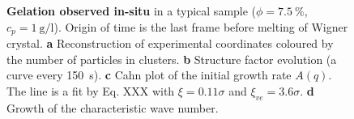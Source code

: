\begin{figure}
\caption{\textbf{Gelation observed in-situ} in a typical sample ($\phi=7.5~\%$, $c_p=\SI{1}{\gram\per\litre}$). Origin of time is the last frame before melting of Wigner crystal. \textbf{a} Reconstruction of experimental coordinates coloured by the number of particles in clusters. \textbf{b} Structure factor evolution (a curve every \SI{150}{\second}). \textbf{c} Cahn plot of the initial growth rate $A(q)$. The line is a fit by Eq. XXX with $\xi=0.11\sigma$ and $\xi_{ve}=3.6\sigma$. \textbf{d} Growth of the characteristic wave number.}
\label{fig:wholeprocess}
\end{figure}

